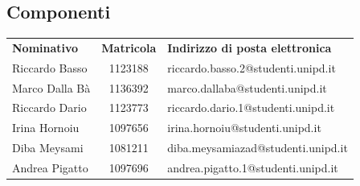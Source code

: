 \subsection{Componenti}
\begin{table}[H]
	\centering\renewcommand{\arraystretch}{1.5}
	
	\begin{tabular}{l c l}
		
		
		\rowcolorhead 
		{ \textbf{Nominativo}} &
		{ \textbf{Matricola}} &
		{ \textbf{Indirizzo di posta elettronica}}  \\
		
		\rowcolorlight
		Riccardo Basso & 1123188 & riccardo.basso.2@studenti.unipd.it  \\ 
		\rowcolordark
		Marco Dalla Bà & 1136392 & marco.dallaba@studenti.unipd.it  \\ 
		\rowcolorlight
		Riccardo Dario & 1123773 & riccardo.dario.1@studenti.unipd.it  \\ 
		\rowcolordark
		Irina Hornoiu & 1097656 &  irina.hornoiu@studenti.unipd.it \\ 
		\rowcolorlight
		Diba Meysami & 1081211 & diba.meysamiazad@studenti.unipd.it  \\ 
		\rowcolordark
		Andrea Pigatto & 1097696  & andrea.pigatto.1@studenti.unipd.it  \\ 
	\end{tabular}
\end{table}

